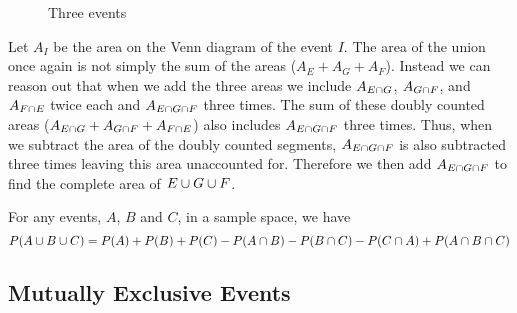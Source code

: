 \begin{figure}[ht]
\centering
{}
\caption{Three events} \label{fig:Three events}
\end{figure}
Let $A_I$ be the area on the Venn diagram of the event $I$. The area of the union once again is not simply the sum of the areas ($A_E + A_G + A_F$). Instead we can reason out that when we add the three areas we include $A_{E \cap G}$, $A_{G \cap F}$, and $A_{F \cap E}$ twice each and $A_{E \cap G \cap F}$ three times. The sum of these doubly counted areas ($A_{E \cap G} + A_{G \cap F} + A_{F \cap E}$) also includes $A_{E \cap G \cap F}$ three times. Thus, when we subtract the area of the doubly counted segments, $A_{E \cap G \cap F}$ is also subtracted three times leaving this area unaccounted for. Therefore we then add $A_{E \cap G \cap F}$ to find the complete area of $E \cup G \cup F$.
\begin{theorem}
For any events, $A$, $B$ and $C$, in a sample space, we have
\[
    P(A \cup B \cup C) = P(A) + P(B) + P(C) - P(A \cap B) - P(B \cap C) - P(C \cap A) + P(A \cap B \cap C)
\]
\end{theorem}
\subsection*{Mutually Exclusive Events}